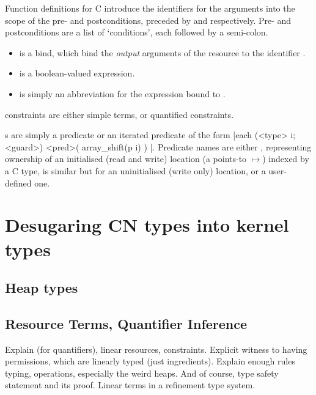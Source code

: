 Function definitions for C introduce the identifiers for the arguments into the
scope of the pre- and postconditions, preceded by  and
 respectively. Pre- and postconditions are a list of
`conditions', each followed by a semi-colon.
\begin{itemize}
    \item {} is a  bind, which bind
        the \emph{output} arguments of the resource to the identifier .
    \item {} is a boolean-valued expression.
    \item {} is simply an abbreviation for the expression  bound to .
\end{itemize}

 constraints are either simple terms, or quantified
constraints.

 s are simply a predicate  %
or an iterated predicate of the form
\cninline[breaklines]|each (<type> i; <guard>) { <pred>( array_shift(p i) ) }|. %
Predicate names  are either , representing ownership
of an initialised (read and write) location (a points-to $\mapsto{}$) indexed
by a C type,  is similar but for an uninitialised (write only) location,
or a user-defined one.

\section{Desugaring CN types into kernel types}\label{sec:desugaring}

\subsection{Heap types}\label{subsec:heap-types}

\subsection{Resource Terms, Quantifier Inference}\label{subsec:resq-inf}

Explain  (for quantifiers), linear resources, constraints.
Explicit witness to having permissions, which are linearly typed (just ingredients).
Explain enough rules \textemdash{} typing, operations, especially the weird heaps.
And of course, type safety statement and its proof.
Linear terms in a refinement type system.

